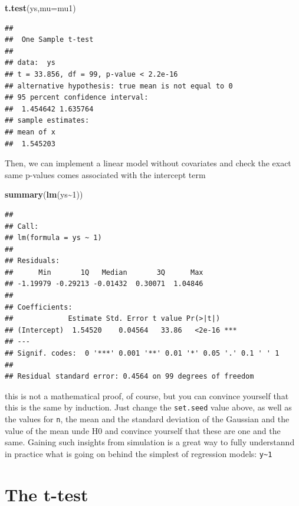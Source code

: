 \documentclass[
]{book}
\newenvironment{Shaded}{\begin{snugshade}}{\end{snugshade}}
\newcommand{\AttributeTok}[1]{\textcolor[rgb]{0.13,0.29,0.53}{#1}}
\newcommand{\DecValTok}[1]{\textcolor[rgb]{0.00,0.00,0.81}{#1}}
\newcommand{\FunctionTok}[1]{\textcolor[rgb]{0.13,0.29,0.53}{\textbf{#1}}}
\newcommand{\NormalTok}[1]{#1}
\newcommand{\SpecialCharTok}[1]{\textcolor[rgb]{0.81,0.36,0.00}{\textbf{#1}}}
\begin{document}
\begin{Shaded}
\begin{Highlighting}[]
\FunctionTok{t.test}\NormalTok{(ys,}\AttributeTok{mu=}\NormalTok{mu1)}
\end{Highlighting}
\end{Shaded}

\begin{verbatim}
## 
##  One Sample t-test
## 
## data:  ys
## t = 33.856, df = 99, p-value < 2.2e-16
## alternative hypothesis: true mean is not equal to 0
## 95 percent confidence interval:
##  1.454642 1.635764
## sample estimates:
## mean of x 
##  1.545203
\end{verbatim}

Then, we can implement a linear model without covariates and check the exact same p-values comes associated with the intercept term

\begin{Shaded}
\begin{Highlighting}[]
\FunctionTok{summary}\NormalTok{(}\FunctionTok{lm}\NormalTok{(ys}\SpecialCharTok{\textasciitilde{}}\DecValTok{1}\NormalTok{))}
\end{Highlighting}
\end{Shaded}

\begin{verbatim}
## 
## Call:
## lm(formula = ys ~ 1)
## 
## Residuals:
##      Min       1Q   Median       3Q      Max 
## -1.19979 -0.29213 -0.01432  0.30071  1.04846 
## 
## Coefficients:
##             Estimate Std. Error t value Pr(>|t|)    
## (Intercept)  1.54520    0.04564   33.86   <2e-16 ***
## ---
## Signif. codes:  0 '***' 0.001 '**' 0.01 '*' 0.05 '.' 0.1 ' ' 1
## 
## Residual standard error: 0.4564 on 99 degrees of freedom
\end{verbatim}

this is not a mathematical proof, of course, but you can convince yourself that this is the same by induction. Just change the \texttt{set.seed} value above, as well as the values for \texttt{n}, the mean and the standard deviation of the Gaussian and the value of the mean unde H0 and convince yourself that these are one and the same. Gaining such insights from simulation is a great way to fully understannd in practice what is going on behind the simplest of regression models: \texttt{y\textasciitilde{}1}

\hypertarget{the-t-test}{%
\section{The t-test}\label{the-t-test}}
\end{document}
